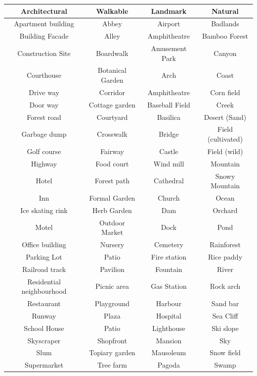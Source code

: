 \begin{table}[htb!]
    \centering
    \begin{tabular}{ |c|c|c|c| }
        \hline
        \textbf{Architectural} & \textbf{Walkable} & \textbf{Landmark} & \textbf{Natural} \\
        \hline
        Apartment building & Abbey & Airport & Badlands\\
        Building Facade & Alley & Amphitheatre & Bamboo Forest\\
        Construction Site & Boardwalk & Amusement Park & Canyon \\
        Courthouse & Botanical Garden & Arch & Coast \\
        Drive way & Corridor & Amphitheatre & Corn field \\
        Door way & Cottage garden & Baseball Field & Creek \\
        Forest road & Courtyard & Basilica & Desert (Sand) \\
        Garbage dump & Crosswalk & Bridge & Field (cultivated)\\
        Golf course & Fairway & Castle & Field (wild)\\
        Highway & Food court & Wind mill & Mountain \\
        Hotel & Forest path & Cathedral & Snowy Mountain \\
        Inn & Formal Garden & Church & Ocean \\
        Ice skating rink & Herb Garden & Dam & Orchard \\
        Motel & Outdoor Market & Dock & Pond \\
        Office building & Nursery & Cemetery & Rainforest \\
        Parking Lot & Patio & Fire station & Rice paddy \\
        Railroad track & Pavilion & Fountain & River \\
        Residential neighbourhood & Picnic area & Gas Station & Rock arch\\
        Restaurant & Playground & Harbour & Sand bar \\
        Runway & Plaza & Hospital & Sea Cliff\\
        School House & Patio & Lighthouse & Ski slope \\
        Skyscraper & Shopfront & Mansion & Sky \\
        Slum & Topiary garden & Mausoleum & Snow field \\
        Supermarket & Tree farm & Pagoda & Swamp \\

\end{tabular}
\end{table}
